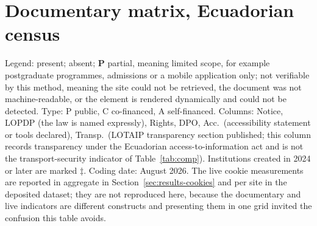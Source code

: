 \section{Documentary matrix, Ecuadorian census}\label{ap:ecuador}
\setcounter{table}{0}\setcounter{figure}{0}

Legend: \si{} present; \no{} absent; \textbf{P} partial, meaning limited scope, for example postgraduate programmes, admissions or a mobile application only; \nv{} not verifiable by this method, meaning the site could not be retrieved, the document was not machine-readable, or the element is rendered dynamically and could not be detected. Type: P public, C co-financed, A self-financed. Columns: Notice, LOPDP (the law is named expressly), Rights, DPO, Acc.\ (accessibility statement or tools declared), Transp.\ (LOTAIP transparency section published; this column records transparency under the Ecuadorian access-to-information act and is not the transport-security indicator of Table~\ref{tab:comp}). Institutions created in 2024 or later are marked $\ddagger$. Coding date: August 2026. The live cookie measurements are reported in aggregate in Section~\ref{sec:results-cookies} and per site in the deposited dataset; they are not reproduced here, because the documentary and live indicators are different constructs and presenting them in one grid invited the confusion this table avoids.

